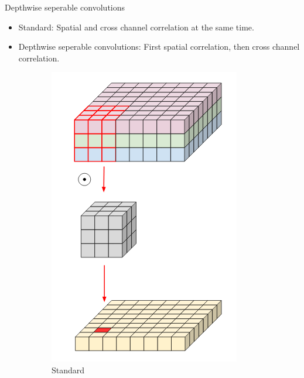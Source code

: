 \documentclass{beamer}
\begin{document}
\begin{frame}{Depthwise seperable convolutions}
	\begin{small}
	\begin{itemize}
		\item Standard: Spatial and cross channel correlation at the same time.
		\item Depthwise seperable convolutions: First spatial correlation, then cross channel correlation.
	\end{itemize}
	\end{small}
	
	\begin{figure}
		\centering
		\begin{subfigure}{.2\textwidth}
			\centering
			\includegraphics[width=0.9\linewidth]{images/standard_conv}
			\caption{Standard}
		\end{subfigure}
		\begin{subfigure}{.5\textwidth}

\end{subfigure}
\end{figure}
\end{frame}
\end{document}

